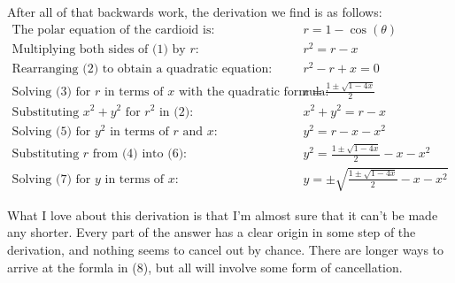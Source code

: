 \documentclass{article}
\begin{document}
After all of that backwards work, the derivation we find is as follows:
\begin{align}
\text{The polar equation of the cardioid is: } & r = 1-\cos(\theta) \\
\text{Multiplying both sides of (1) by } r \text{: } & r^2 = r-x \\
\text{Rearranging (2) to obtain a quadratic equation: } & r^2-r+x = 0 \\
\text{Solving (3) for } r \text{ in terms of } x \text{ with the quadratic formula: } & r = \frac{1\pm\sqrt{1-4x}}{2} \\
\text{Substituting } x^2+y^2 \text{ for } r^2 \text{ in (2): } & x^2+y^2 = r-x \\
\text{Solving (5) for } y^2 \text{ in terms of } r \text{ and } x \text{: } & y^2 = r-x-x^2 \\
\text{Substituting } r \text{ from (4) into (6): } & y^2 = \frac{1\pm\sqrt{1-4x}}{2}-x-x^2\\
\text{Solving (7) for } y \text{ in terms of } x \text{: } & y = \pm\sqrt{\frac{1\pm\sqrt{1-4x}}{2}-x-x^2}
\end{align}

What I love about this derivation is that I'm almost sure that it can't be made any shorter.
Every part of the answer has a clear origin in some step of the derivation,
and nothing seems to cancel out by chance.
There are longer ways to arrive at the formla in (8),
but all will involve some form of cancellation.

\end{document}
